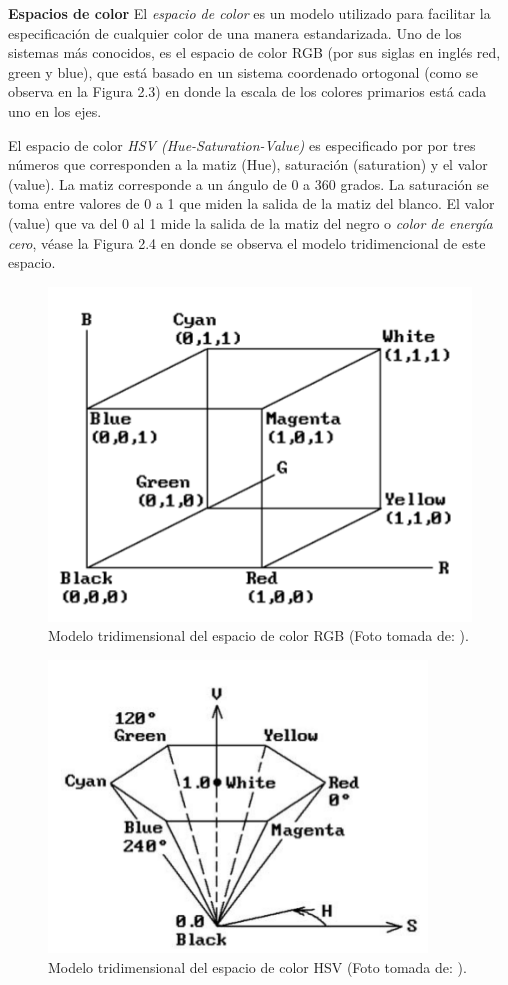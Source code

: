 \documentclass{book}
\begin{document}
\textbf{Espacios de color}
El \textit{espacio de color} es un modelo utilizado para facilitar la especificación de cualquier color de una manera estandarizada. Uno de los sistemas más conocidos, es el espacio de color RGB (por sus siglas en inglés red, green y blue), que está basado en un sistema coordenado ortogonal (como se observa en la Figura 2.3) en donde la escala de los colores primarios está cada uno en los ejes.

El espacio de color \textit{HSV (Hue-Saturation-Value)} es especificado por por tres números que corresponden a la matiz (Hue), saturación (saturation) y el valor (value). La matiz corresponde a un ángulo de 0 a 360 grados. La saturación se toma entre valores de 0 a 1 que miden la salida de la matiz del blanco. El valor (value) que va del 0 al 1 mide la salida de la matiz del negro o \textit{color de energía cero}, véase la Figura 2.4 en donde se observa el modelo tridimencional de este espacio.

\begin{figure}
	\centering		
	\includegraphics[scale=0.4]{images/RGB_model.png}
	\caption{Modelo tridimensional del espacio de color RGB (Foto tomada de: \cite{agoston2005computer}).}		
\end{figure}

\begin{figure}
	\centering		
	\includegraphics[scale=0.6]{images/hexacono_HSV.png}
	\caption{Modelo tridimensional del espacio de color HSV (Foto tomada de: \cite{agoston2005computer}).}		
\end{figure}
\end{document}

